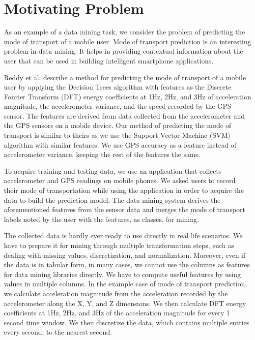 \section{Motivating Problem}

As an example of a data mining task, we consider the problem of predicting the mode of transport of a mobile user. Mode of transport prediction is an interesting problem in data mining. It helps in providing contextual information about the user that can be used in building intelligent smartphone applications.

Reddy et al. \cite{MTP} describe a method for predicting the mode of transport of a mobile user by applying the Decision Trees algorithm with features as the Discrete Fourier Transform (DFT) energy coefficients at 1Hz, 2Hz, and 3Hz of acceleration magnitude, the accelerometer variance, and the speed recorded by the GPS sensor. The features are derived from data collected from the accelerometer and the GPS sensors on a mobile device. Our method of predicting the mode of transport is similar to theirs as we use the Support Vector Machine (SVM) algorithm with similar features. We use GPS accuracy as a feature instead of accelerometer variance, keeping the rest of the features the same.

To acquire training and testing data, we use an application that collects accelerometer and GPS readings on mobile phones. We asked users to record their mode of transportation while using the application in order to acquire the data to build the prediction model. The data mining system derives the aforementioned features from the sensor data and merges the mode of transport labels noted by the user with the features, as classes, for mining.

The collected data is hardly ever ready to use directly in real life scenarios. We have to prepare it for mining through multiple transformation steps, such as dealing with missing values, discretization, and normalization. Moreover, even if the data is in tabular form, in many cases, we cannot use the columns as features for data mining libraries directly. We have to compute useful features by using values in multiple columns. In the example case of mode of transport prediction, we calculate acceleration magnitude from the acceleration recorded by the accelerometer along the X, Y, and Z dimensions. We then calculate DFT energy coefficients at 1Hz, 2Hz, and 3Hz of the acceleration magnitude for every 1 second time window. We then discretize the data, which contains multiple entries every second, to the nearest second. 

